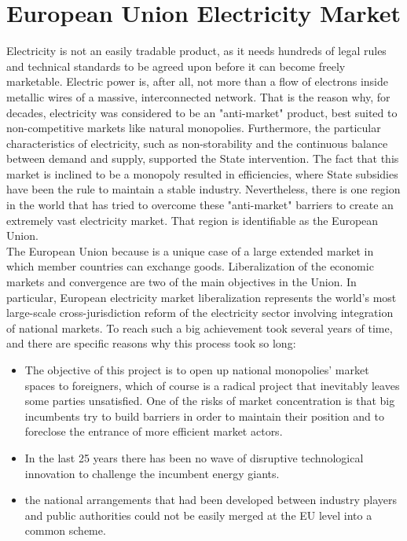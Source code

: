 \documentclass{book}
\begin{document}
\section*{European Union Electricity Market}

Electricity is not an easily tradable product, as it needs hundreds of  legal rules and technical standards to be agreed upon before it can become freely marketable. Electric power is, after all, not more than a flow of electrons inside metallic wires of a massive, interconnected network. That is the reason why, for decades, electricity was considered to be an "anti-market" product, best suited to non-competitive markets like natural monopolies. \cite{glachant2014eu} Furthermore, the particular characteristics of electricity, such as non-storability and the continuous balance between demand and supply, supported the State intervention. The fact that this market is inclined to be a monopoly resulted in efficiencies, where State subsidies have been the rule to maintain a stable industry. \cite{domanico2007concentration} Nevertheless, there is one region in the world that has tried to overcome these "anti-market" barriers to create an extremely vast electricity market. That region is identifiable as the European Union. \\

The European Union because is a unique case of a large extended market in which member countries can exchange goods.  Liberalization of the economic markets and convergence are two of the main objectives in the Union. In particular, European electricity market liberalization represents the world's most large-scale cross-jurisdiction reform of the electricity sector involving integration of national markets. To reach such a big achievement took several years of time, and there are specific reasons why this process took so long:

\begin{itemize}

\item The objective of this project is to open up national monopolies’ market spaces to foreigners, which of course is a radical
project that inevitably leaves some parties unsatisfied.  One of the risks of market concentration is that big incumbents try to build
barriers in order to maintain their position and to foreclose the entrance of more efficient market actors. \cite{ringel2003liberalising}

\item In the last 25 years there has been no wave of disruptive technological innovation to challenge the incumbent energy
giants.

\item the national arrangements that had been developed between industry players and public authorities could not be easily merged at the EU level into a common scheme.
\end{itemize}
\end{document}
